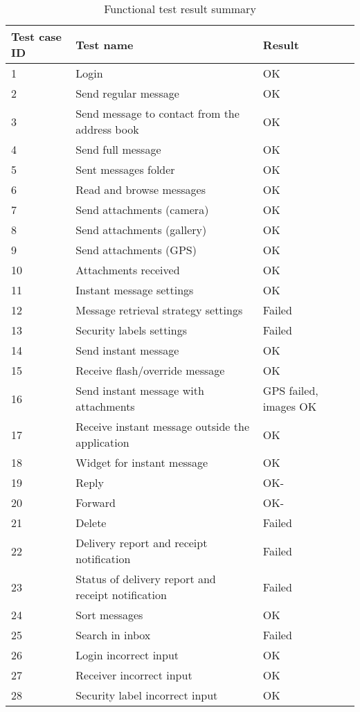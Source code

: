 \begin{table}[hbt]
\begin{center}
					\begin{tabular}{l|l|l}\hline
						\textbf{Test case ID} & \textbf{Test name} & \textbf{Result} \\ \hline \hline
						1&Login&OK\\
						2&Send regular message&OK\\
						3&Send message to contact from the address book&OK\\
						4&Send full message&OK\\
						5&Sent messages folder&OK\\
						6&Read and browse messages&OK\\
						7&Send attachments (camera)&OK\\
						8&Send attachments (gallery)&OK\\
						9&Send attachments (GPS)&OK\\
						10&Attachments received&OK\\
						11&Instant message settings&OK\\
						12&Message retrieval strategy settings&Failed\\
						13&Security labels settings&Failed\\
						14&Send instant message&OK\\
						15&Receive flash/override message&OK\\
						16&Send instant message with attachments&GPS failed, images OK\\
						17&Receive instant message outside the application&OK\\
						18&Widget for instant message&OK\\
						19&Reply&OK-\\
						20&Forward&OK-\\
						21&Delete&Failed\\
						22&Delivery report and receipt notification&Failed\\
						23&Status of delivery report and receipt notification&Failed\\
						24&Sort messages&OK\\
						25&Search in inbox&Failed\\	
						26&Login incorrect input&OK\\
						27&Receiver incorrect input&OK\\
						28&Security label incorrect input&OK\\ \hline
					\end{tabular}
\end{center}
\caption{Functional test result summary} \label{tab:caseresults}
\end{table}

